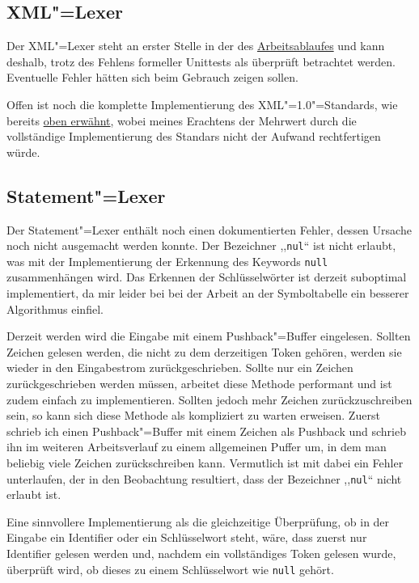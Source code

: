 \documentclass[10pt,a4paper,ngerman,titlepage,tocindentauto]{scrartcl}
\begin{document}
		\subsection{XML"=Lexer}
			Der XML"=Lexer steht an erster Stelle in der des \hyperlink{Verlaufdiagramm}{Arbeitsablaufes} und kann deshalb,
			trotz des Fehlens formeller Unittests als überprüft betrachtet werden. Eventuelle Fehler hätten sich
			beim Gebrauch zeigen sollen.
			
			Offen ist noch die komplette Implementierung des XML"=1.0"=Standards, wie bereits
			\hyperlink{Teilprojekte_XML_Lexer}{oben erwähnt}, wobei meines Erachtens der Mehrwert
			durch die vollständige Implementierung des Standars nicht der Aufwand rechtfertigen
			würde.
	
		\subsection{Statement"=Lexer}
			Der Statement"=Lexer enthält noch einen dokumentierten Fehler, dessen Ursache noch nicht ausgemacht werden konnte.
			Der Bezeichner ,,\texttt{nul}`` ist nicht erlaubt, was mit der Implementierung der Erkennung des Keywords
			\texttt{null} zusammenhängen wird. Das Erkennen der Schlüsselwörter ist derzeit suboptimal implementiert, da
			mir leider bei bei der Arbeit an der Symboltabelle ein besserer Algorithmus einfiel.
			
			Derzeit werden wird die Eingabe mit einem Pushback"=Buffer eingelesen. Sollten Zeichen gelesen werden,
			die nicht zu dem derzeitigen Token gehören, werden sie wieder in den Eingabestrom zurückgeschrieben.
			Sollte nur ein Zeichen zurückgeschrieben werden müssen, arbeitet diese Methode performant und ist zudem
			einfach zu implementieren. Sollten jedoch mehr Zeichen zurückzuschreiben sein, so kann sich diese Methode
			als kompliziert zu warten erweisen. Zuerst schrieb ich einen Pushback"=Buffer mit einem Zeichen als
			Pushback und schrieb ihn im weiteren Arbeitsverlauf zu einem allgemeinen Puffer um, in dem man beliebig
			viele Zeichen zurückschreiben kann. Vermutlich ist mit dabei ein Fehler unterlaufen, der in den Beobachtung
			resultiert, dass der Bezeichner ,,\texttt{nul}`` nicht erlaubt ist.
			
			Eine sinnvollere Implementierung als die gleichzeitige Überprüfung, ob in der Eingabe ein Identifier oder
			ein Schlüsselwort steht, wäre, dass zuerst nur Identifier gelesen werden und, nachdem ein vollständiges
			Token gelesen wurde, überprüft wird, ob dieses zu einem Schlüsselwort wie \texttt{null} gehört.
	
\end{document}

